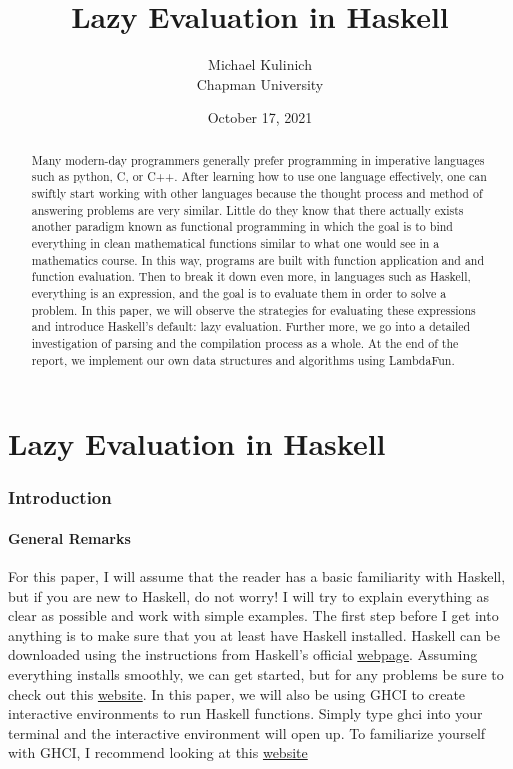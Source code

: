 \documentclass{article}
\title{Lazy Evaluation in Haskell}
\author{Michael Kulinich  \\ Chapman University}
\date{October 17, 2021}
\begin{document}
\maketitle

\begin{abstract}

\medskip\noindent
Many modern-day programmers generally prefer programming in imperative languages such as python, C, or C++. After learning how to use one language effectively, one can swiftly start working with other languages because the thought process and method of answering problems are very similar. Little do they know that there actually exists another paradigm known as functional programming in which the goal is to bind everything in clean mathematical functions similar to what one would see in a mathematics course. In this way, programs are built with function application and and function evaluation. Then to break it down even more, in languages such as Haskell, everything is an expression, and the goal is to evaluate them in order to solve a problem. In this paper, we will observe the strategies for evaluating these expressions and introduce Haskell's default: lazy evaluation. Further more, we go into a detailed investigation of parsing and the compilation process as a whole. At the end of the report, we implement our own data structures and algorithms using LambdaFun.
\end{abstract}

\tableofcontents

\part{Lazy Evaluation in Haskell}
\section{Introduction}\label{intro}

\subsection{General Remarks}

\medskip\noindent
For this paper, I will assume that the reader has a basic familiarity with Haskell, but if you are new to Haskell, do not worry! I will try to explain everything as clear as possible and work with simple examples. The first step before I get into anything is to make sure that you at least have Haskell installed. Haskell can be downloaded using the instructions from Haskell's official  \href{https://www.haskell.org/}{webpage}. Assuming everything installs smoothly, we can get started, but for any problems be sure to check out this \href{https://www.haskell.org/platform/}{website}. In this paper, we will also be using GHCI to create interactive environments to run Haskell functions. Simply type $\textrm{ghci}$ into your terminal and the interactive environment will open up. To familiarize yourself with GHCI, I recommend looking at this \href{https://downloads.haskell.org/~ghc/9.0.1/docs/html/users_guide/ghci.html}{website}
\end{document}
